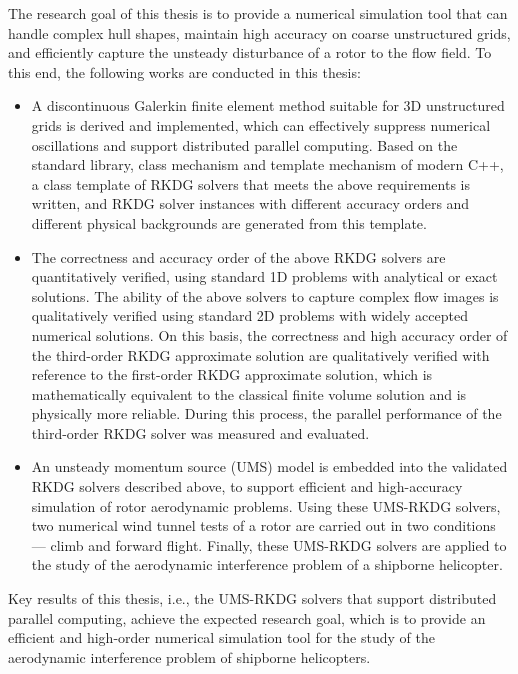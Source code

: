 \begin{eabstract}
The research goal of this thesis is to provide a numerical simulation tool that can handle complex hull shapes, maintain high accuracy on coarse unstructured grids, and efficiently capture the unsteady disturbance of a rotor to the flow field.
To this end, the following works are conducted in this thesis:
\begin{itemize}[wide]
\item A discontinuous Galerkin finite element method suitable for 3D unstructured grids is derived and implemented, which can effectively suppress numerical oscillations and support distributed parallel computing. Based on the standard library, class mechanism and template mechanism of modern C++, a class template of RKDG solvers that meets the above requirements is written, and RKDG solver instances with different accuracy orders and different physical backgrounds are generated from this template.
\item The correctness and accuracy order of the above RKDG solvers are quantitatively verified, using standard 1D problems with analytical or exact solutions. The ability of the above solvers to capture complex flow images is qualitatively verified using standard 2D  problems with widely accepted numerical solutions. On this basis, the correctness and high accuracy order of the third-order RKDG approximate solution are qualitatively verified with reference to the first-order RKDG approximate solution, which is mathematically equivalent to the classical finite volume solution and is physically more reliable. During this process, the parallel performance of the third-order RKDG solver was measured and evaluated.
\item An unsteady momentum source (UMS) model is embedded into the validated RKDG solvers described above, to support efficient and high-accuracy simulation of rotor aerodynamic problems. Using these UMS-RKDG solvers, two numerical wind tunnel tests of a rotor are carried out in two conditions --- climb and forward flight. Finally, these UMS-RKDG solvers are applied to the study of the aerodynamic interference problem of a shipborne helicopter.
\end{itemize}

Key results of this thesis, i.e., the UMS-RKDG solvers that support distributed parallel computing, achieve the expected research goal, which is to provide an efficient and high-order numerical simulation tool for the study of the aerodynamic interference problem of shipborne helicopters.
\end{eabstract}